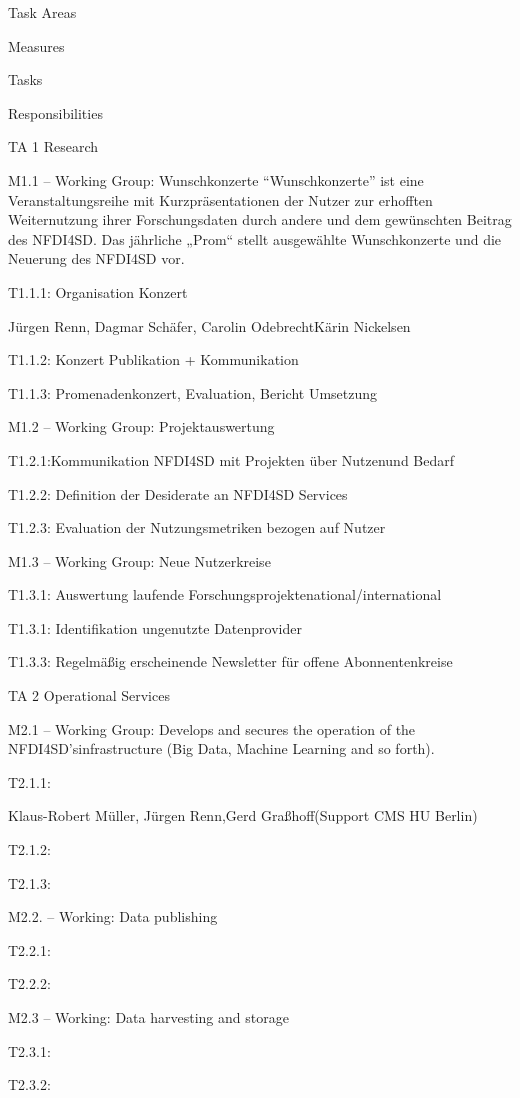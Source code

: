 \documentclass[
  english,
  paper=a4,
  oneside,captions=tableheading
]{scrbook}
\begin{document}
Task Areas

Measures

Tasks

Responsibilities

TA 1 Research

M1.1 -- Working Group: Wunschkonzerte ``Wunschkonzerte'' ist eine
Veranstaltungsreihe mit Kurzpräsentationen der Nutzer zur erhofften
Weiternutzung ihrer Forschungsdaten durch andere und dem gewünschten
Beitrag des NFDI4SD. Das jährliche „Prom`` stellt ausgewählte
Wunschkonzerte und die Neuerung des NFDI4SD vor.

T1.1.1: Organisation Konzert

Jürgen Renn, Dagmar Schäfer, Carolin OdebrechtKärin Nickelsen

T1.1.2: Konzert Publikation + Kommunikation

T1.1.3: Promenadenkonzert, Evaluation, Bericht Umsetzung

M1.2 -- Working Group: Projektauswertung

T1.2.1:Kommunikation NFDI4SD mit Projekten über Nutzenund Bedarf

T1.2.2: Definition der Desiderate an NFDI4SD Services

T1.2.3: Evaluation der Nutzungsmetriken bezogen auf Nutzer

M1.3 -- Working Group: Neue Nutzerkreise

T1.3.1: Auswertung laufende Forschungsprojektenational/international

T1.3.1: Identifikation ungenutzte Datenprovider

T1.3.3: Regelmäßig erscheinende Newsletter für offene Abonnentenkreise

TA 2 Operational Services

M2.1 -- Working Group: Develops and secures the operation of the
NFDI4SD'sinfrastructure (Big Data, Machine Learning and so forth).

T2.1.1:

Klaus-Robert Müller, Jürgen Renn,Gerd Graßhoff(Support CMS HU Berlin)

T2.1.2:

T2.1.3:

M2.2. -- Working: Data publishing

T2.2.1:

T2.2.2:

M2.3 -- Working: Data harvesting and storage

T2.3.1:

T2.3.2:
\end{document}
